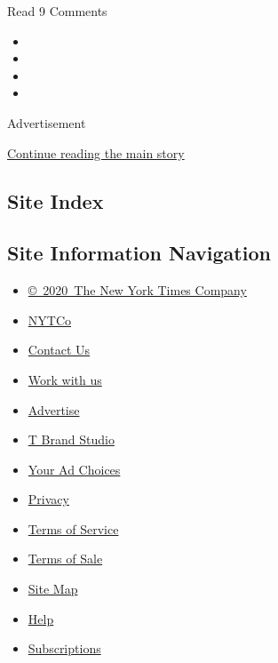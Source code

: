 Read 9 Comments

\begin{itemize}
\item
\item
\item
\item
\end{itemize}

Advertisement

\protect\hyperlink{after-bottom}{Continue reading the main story}

\hypertarget{site-index}{%
\subsection{Site Index}\label{site-index}}

\hypertarget{site-information-navigation}{%
\subsection{Site Information
Navigation}\label{site-information-navigation}}

\begin{itemize}
\tightlist
\item
  \href{https://help.nytimes3xbfgragh.onion/hc/en-us/articles/115014792127-Copyright-notice}{©~2020~The
  New York Times Company}
\end{itemize}

\begin{itemize}
\tightlist
\item
  \href{https://www.nytco.com/}{NYTCo}
\item
  \href{https://help.nytimes3xbfgragh.onion/hc/en-us/articles/115015385887-Contact-Us}{Contact
  Us}
\item
  \href{https://www.nytco.com/careers/}{Work with us}
\item
  \href{https://nytmediakit.com/}{Advertise}
\item
  \href{http://www.tbrandstudio.com/}{T Brand Studio}
\item
  \href{https://www.nytimes3xbfgragh.onion/privacy/cookie-policy\#how-do-i-manage-trackers}{Your
  Ad Choices}
\item
  \href{https://www.nytimes3xbfgragh.onion/privacy}{Privacy}
\item
  \href{https://help.nytimes3xbfgragh.onion/hc/en-us/articles/115014893428-Terms-of-service}{Terms
  of Service}
\item
  \href{https://help.nytimes3xbfgragh.onion/hc/en-us/articles/115014893968-Terms-of-sale}{Terms
  of Sale}
\item
  \href{https://spiderbites.nytimes3xbfgragh.onion}{Site Map}
\item
  \href{https://help.nytimes3xbfgragh.onion/hc/en-us}{Help}
\item
  \href{https://www.nytimes3xbfgragh.onion/subscription?campaignId=37WXW}{Subscriptions}
\end{itemize}
